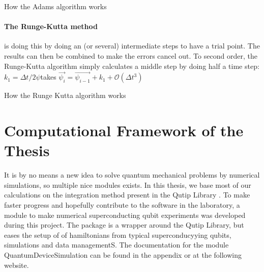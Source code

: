 \begin{marginfigure}
    \centering
    \caption{How the Adams algorithm works}
    \label{fig:Adams integration}
\end{marginfigure}

\paragraph{The Runge-Kutta method} is doing this by doing an (or several) intermediate steps to have a trial point. The results can then be combined to make the errors cancel out. To second order, the Runge-Kutta algorithm simply calculates a middle step by doing half a time step: $k_1 = \Delta t / 2 \psi $takes $\Vec{\psi_i} = \Vec{\psi_{i-1}} + k_1 + \mathcal{O}(\Delta t^3)$

\begin{marginfigure}
    \centering
    \caption{How the Runge Kutta algorithm works}
    \label{fig:Runge-Kutta}
\end{marginfigure}




\section{Computational Framework of the Thesis}
It is by no means a new idea to solve quantum mechanical problems by numerical simulations, so multiple nice modules exists. In this thesis, we base most of our calculations on the integration method present in the Qutip Library . To make faster progress and hopefully contribute to the software in the laboratory, a module to make numerical superconducting qubit experiments was developed during this project. The package is a wrapper around the Qutip Library, but eases the setup of of hamiltonians from typical superconducyying qubits, simulations and data managementS. The documentation for the module QuantumDeviceSimulation can be found in the appendix or at the following website. 

